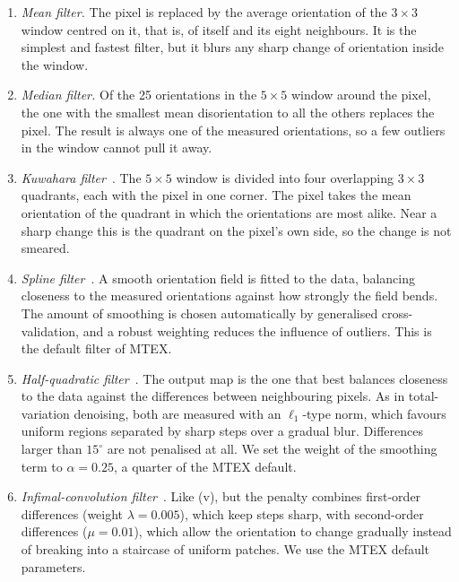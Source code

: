 \begin{enumerate}
  \item[(i)] \emph{Mean filter.} The pixel is replaced by the average
    orientation of the $3 \times 3$ window centred on it, that is, of itself
    and its eight neighbours. It is the simplest and fastest filter, but it
    blurs any sharp change of orientation inside the window.
  \item[(ii)] \emph{Median filter.} Of the 25 orientations in the
    $5 \times 5$ window around the pixel, the one with the smallest mean
    disorientation to all the others replaces the pixel. The result is
    always one of the measured orientations, so a few outliers in the window
    cannot pull it away.
  \item[(iii)] \emph{Kuwahara filter}~\cite{kuwahara1976processing}. The
    $5 \times 5$ window is divided into four overlapping $3 \times 3$
    quadrants, each with the pixel in one corner. The pixel takes the mean
    orientation of the quadrant in which the orientations are most alike.
    Near a sharp change this is the quadrant on the pixel's own side, so the
    change is not smeared.
  \item[(iv)] \emph{Spline filter}~\cite{garcia2010robust}. A smooth
    orientation field is fitted to the data, balancing closeness to the
    measured orientations against how strongly the field bends. The amount of
    smoothing is chosen automatically by generalised cross-validation, and a
    robust weighting reduces the influence of outliers. This is the default
    filter of MTEX.
  \item[(v)] \emph{Half-quadratic filter}~\cite{bergmann2016restoration}.
    The output map is the one that best balances closeness to the data against
    the differences between neighbouring pixels. As in total-variation
    denoising, both are measured with an $\ell_1$-type norm, which favours
    uniform regions separated by sharp steps over a gradual blur. Differences
    larger than $15^\circ$ are not penalised at all. We set the weight of the
    smoothing term to $\alpha = 0.25$, a quarter of the MTEX default.
  \item[(vi)] \emph{Infimal-convolution filter}~\cite{bergmann2018priors}.
    Like (v), but the penalty combines first-order differences (weight
    $\lambda = 0.005$), which keep steps sharp, with second-order differences
    ($\mu = 0.01$), which allow the orientation to change gradually instead
    of breaking into a staircase of uniform patches. We use the MTEX default
    parameters.
\end{enumerate}


